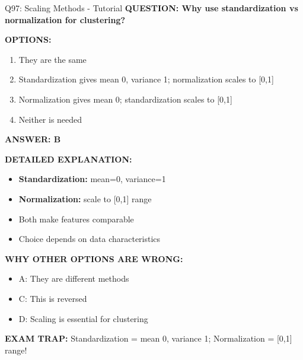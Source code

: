 \documentclass[8pt]{beamer}
\begin{document}
	\begin{frame}{Q97: Scaling Methods - Tutorial}
		\fontsize{6.5}{7.5}\selectfont
		\textbf{QUESTION: Why use standardization vs normalization for clustering?}
		
		\vspace{0.1cm}
		\textbf{OPTIONS:}
		\begin{enumerate}
			\item They are the same
			\item Standardization gives mean 0, variance 1; normalization scales to [0,1]
			\item Normalization gives mean 0; standardization scales to [0,1]
			\item Neither is needed
		\end{enumerate}
		
		\vspace{0.1cm}
		\textcolor{myblue}{\textbf{ANSWER: B}}
		
		\vspace{0.1cm}
		\textbf{DETAILED EXPLANATION:}
		\begin{itemize}
			\item \textbf{Standardization:} mean=0, variance=1
			\item \textbf{Normalization:} scale to [0,1] range
			\item Both make features comparable
			\item Choice depends on data characteristics
		\end{itemize}
		
		\vspace{0.1cm}
		\textcolor{myred}{\textbf{WHY OTHER OPTIONS ARE WRONG:}}
		\begin{itemize}
			\item \textcolor{myred}{A:} They are different methods
			\item \textcolor{myred}{C:} This is reversed
			\item \textcolor{myred}{D:} Scaling is essential for clustering
		\end{itemize}
		
		\textcolor{myred}{\textbf{EXAM TRAP:}} Standardization = \textcolor{myblue}{mean 0, variance 1}; Normalization = \textcolor{myblue}{[0,1] range}!
	\end{frame}
	
\end{document}
